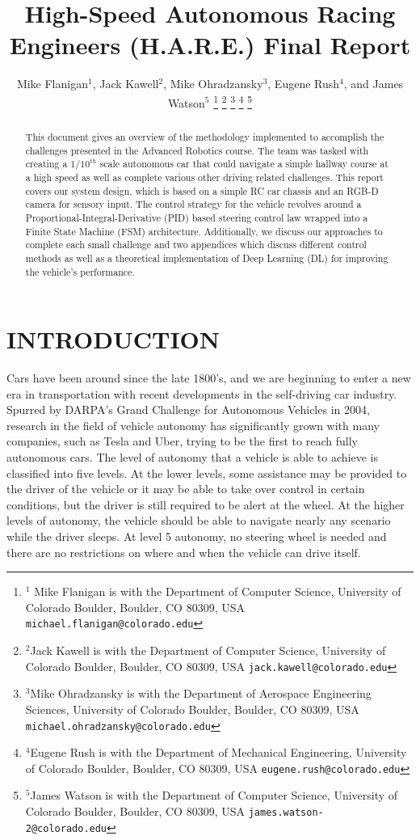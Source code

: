 \documentclass[letterpaper, 10 pt, conference]{ieeeconf}  %
\title{\LARGE \bf
High-Speed Autonomous Racing Engineers (H.A.R.E.) Final Report
}
\author{Mike Flanigan$^{1}$, Jack Kawell$^{2}$, Mike Ohradzansky$^{3}$, Eugene Rush$^{4}$,  and James Watson$^{5}$%
\thanks{$^{1}$ Mike Flanigan is with the Department of Computer Science, University of Colorado Boulder,
        Boulder, CO 80309, USA
        {\tt\small michael.flanigan@colorado.edu}}%
\thanks{$^{2}$Jack Kawell is with the Department of Computer Science, University of Colorado Boulder,
        Boulder, CO 80309, USA
        {\tt\small jack.kawell@colorado.edu}}%
\thanks{$^{3}$Mike Ohradzansky is with the Department of Aerospace Engineering Sciences, University of Colorado Boulder,
        Boulder, CO 80309, USA
        {\tt\small michael.ohradzansky@colorado.edu}}%
\thanks{$^{4}$Eugene Rush is with the Department of Mechanical Engineering, University of Colorado Boulder,
        Boulder, CO 80309, USA
        {\tt\small eugene.rush@colorado.edu}}%
\thanks{$^{5}$James Watson is with the Department of Computer Science, University of Colorado Boulder,
        Boulder, CO 80309, USA
        {\tt\small james.watson-2@colorado.edu}}%
}
\begin{document}
\maketitle
\thispagestyle{empty}
\pagestyle{empty}


\begin{abstract}

This document gives an overview of the methodology implemented to accomplish the challenges presented in the Advanced Robotics course. The team was tasked with creating a $1/10^{th}$ scale autonomous car that could navigate a simple hallway course at a high speed as well as complete various other driving related challenges. This report covers our system design, which is based on a simple RC car chassis and an RGB-D camera for sensory input. The control strategy for the vehicle revolves around a Proportional-Integral-Derivative (PID) based steering control law wrapped into a Finite State Machine (FSM) architecture. Additionally, we discuss our approaches to complete each small challenge and two appendices which discuss different control methods as well as a theoretical implementation of Deep Learning (DL) for improving the vehicle's performance.

\end{abstract}


\section{INTRODUCTION}

Cars have been around since the late 1800's, and we are beginning to enter a new era in transportation with recent developments in the self-driving car industry. Spurred by DARPA's Grand Challenge for Autonomous Vehicles in 2004, research in the field of vehicle autonomy has significantly grown with many companies, such as Tesla and Uber, trying to be the first to reach fully autonomous cars. The level of autonomy that a vehicle is able to achieve is classified into five levels. At the lower levels, some assistance may be provided to the driver of the vehicle or it may be able to take over control in certain conditions, but the driver is still required to be alert at the wheel. At the higher levels of autonomy, the vehicle should be able to navigate nearly any scenario while the driver sleeps. At level 5 autonomy, no steering wheel is needed and there are no restrictions on where and when the vehicle can drive itself. 
\end{document}
